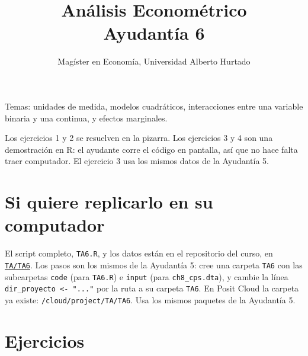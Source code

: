 \documentclass[letterpaper,11pt]{article}
\title{Análisis Econométrico \\ Ayudantía 6}
\author{Magíster en Economía, Universidad Alberto Hurtado}
\date{}
\begin{document}
\maketitle

\noindent Temas: unidades de medida, modelos cuadráticos, interacciones entre una variable
binaria y una continua, y efectos marginales.

\medskip
\noindent Los ejercicios 1 y 2 se resuelven en la pizarra. Los ejercicios 3 y 4 son
una demostración en R: el ayudante corre el código en pantalla, así que no hace falta traer
computador. El ejercicio 3 usa los mismos datos de la Ayudantía 5.

\section*{Si quiere replicarlo en su computador}

\noindent El script completo, \texttt{TA6.R}, y los datos están en el repositorio del curso,
en \href{https://github.com/ramirode/econometria_mae/tree/main/TA/TA6}{\texttt{TA/TA6}}. Los
pasos son los mismos de la Ayudantía 5: cree una carpeta \texttt{TA6} con las subcarpetas
\texttt{code} (para \texttt{TA6.R}) e \texttt{input} (para \texttt{ch8\_cps.dta}), y cambie la
línea \texttt{dir\_proyecto <- "..."} por la ruta a su carpeta \texttt{TA6}. En Posit Cloud la
carpeta ya existe: \texttt{/cloud/project/TA/TA6}. Usa los mismos paquetes de la Ayudantía 5.

\section*{Ejercicios}
\end{document}
